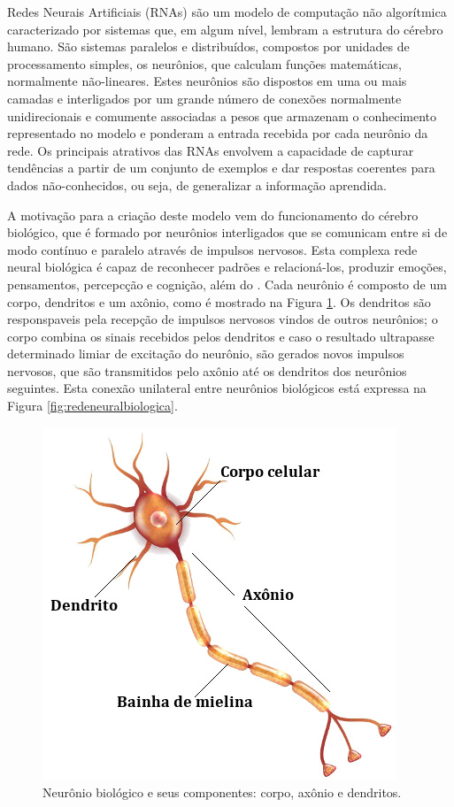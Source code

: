 
Redes Neurais Artificiais (RNAs) são um modelo de computação não algorítmica caracterizado por sistemas que, em algum nível, lembram a estrutura do cérebro humano. São sistemas paralelos e distribuídos, compostos por unidades de processamento simples, os neurônios, que calculam funções matemáticas, normalmente não-lineares. Estes neurônios são dispostos em uma ou mais camadas e interligados por um grande número de conexões normalmente unidirecionais e comumente associadas a pesos que armazenam o conhecimento representado no modelo e ponderam a entrada recebida por cada neurônio da rede. Os principais atrativos das RNAs envolvem a capacidade de capturar tendências a partir de um conjunto de exemplos e dar respostas coerentes para dados não-conhecidos, ou seja, de generalizar a informação aprendida.

A motivação para a criação deste modelo vem do funcionamento do cérebro biológico, que é formado por neurônios interligados que se comunicam entre si de modo contínuo e paralelo através de impulsos nervosos. Esta complexa rede neural biológica é capaz de reconhecer padrões e relacioná-los, produzir emoções, pensamentos, percepcção e cognição, além do . Cada neurônio é composto de um corpo, dendritos e um axônio, como é mostrado na Figura \ref{fig:neuronio_biologico}. Os dendritos são responspaveis pela recepção de impulsos nervosos vindos de outros neurônios; o corpo combina os sinais recebidos pelos dendritos e caso o resultado ultrapasse determinado limiar de excitação do neurônio, são gerados novos impulsos nervosos, que são transmitidos pelo axônio até os dendritos dos neurônios seguintes. Esta conexão unilateral entre neurônios biológicos está expressa na Figura \ref{fig:redeneuralbiologica}.

\begin{figure}[ht]
	\centering
	\includegraphics[height=0.3\textheight]{img/neuronio}
	\caption{Neurônio biológico e seus componentes: corpo, axônio e dendritos.}
	\label{fig:neuronio_biologico}
\end{figure}

